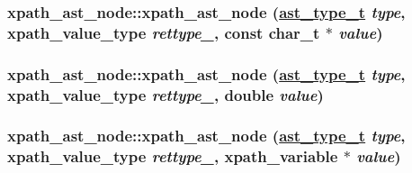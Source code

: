 \hypertarget{classxpath__ast__node_f155d17a4477a693d37f4e34957dcc21}{
\subsubsection[xpath\_\-ast\_\-node]{\setlength{\rightskip}{0pt plus 5cm}xpath\_\-ast\_\-node::xpath\_\-ast\_\-node (\hyperlink{pugixml_8cpp_11258a240266b84b6b0526930e5d330d}{ast\_\-type\_\-t} {\em type}, xpath\_\-value\_\-type {\em rettype\_\-}, const char\_\-t $\ast$ {\em value})}}
\label{classxpath__ast__node_f155d17a4477a693d37f4e34957dcc21}


\hypertarget{classxpath__ast__node_da97458f3fc7d6c87cf70d8084117b0d}{
\subsubsection[xpath\_\-ast\_\-node]{\setlength{\rightskip}{0pt plus 5cm}xpath\_\-ast\_\-node::xpath\_\-ast\_\-node (\hyperlink{pugixml_8cpp_11258a240266b84b6b0526930e5d330d}{ast\_\-type\_\-t} {\em type}, xpath\_\-value\_\-type {\em rettype\_\-}, double {\em value})}}
\label{classxpath__ast__node_da97458f3fc7d6c87cf70d8084117b0d}


\hypertarget{classxpath__ast__node_8de4244f7b9fc7626049197ddc0afab7}{
\subsubsection[xpath\_\-ast\_\-node]{\setlength{\rightskip}{0pt plus 5cm}xpath\_\-ast\_\-node::xpath\_\-ast\_\-node (\hyperlink{pugixml_8cpp_11258a240266b84b6b0526930e5d330d}{ast\_\-type\_\-t} {\em type}, xpath\_\-value\_\-type {\em rettype\_\-}, xpath\_\-variable $\ast$ {\em value})}}
\label{classxpath__ast__node_8de4244f7b9fc7626049197ddc0afab7}


